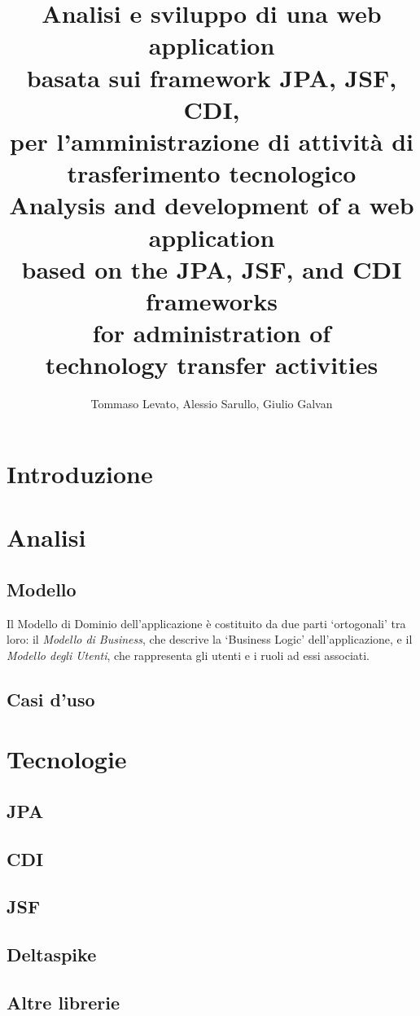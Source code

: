 \documentclass[italian,laurea,oneside,10pt]{UFtesi}
\title{Analisi e sviluppo di una web application \\
basata sui framework JPA, JSF, CDI, \\
per l'amministrazione di attività di trasferimento tecnologico\\\vspace{1.5cm}
Analysis and development of a web application \\
based on the JPA, JSF, and CDI frameworks \\
for administration of \\
technology transfer activities
}
\author{Tommaso Levato, Alessio Sarullo, Giulio Galvan}
\date{}
\begin{document}
\maketitle
\frontmatter



\tableofcontents
\mainmatter
\chapter{Introduzione}


\chapter{Analisi}
\label{analisi}

\section{Modello}
Il Modello di Dominio dell'applicazione è costituito da due parti \textquoteleft ortogonali' tra loro: il \textsl{Modello di Business},
che descrive la \textquoteleft Business Logic' dell'applicazione, e il \textsl{Modello degli Utenti}, che rappresenta gli utenti e i ruoli ad essi associati.


\section{Casi d'uso}



\chapter{Tecnologie}
\label{tecnologie}

\section{JPA}
\label{jpa}

\section{CDI} 
\label{cdi}

\section{JSF}
\label{jsf}

\section{Deltaspike}
\label{delta}

\section{Altre librerie}
\label{libs}
\end{document}
